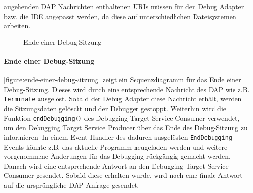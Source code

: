 augehenden DAP Nachrichten enthaltenen URIs müssen für den Debug Adapter bzw. die IDE angepasst werden, da diese auf unterschiedlichen Dateisystemen arbeiten.

\begin{figure}[tbp]
    \centering
    \caption{Ende einer Debug-Sitzung}
    \label{figure:ende-einer-debug-sitzung}
\end{figure}

\paragraph{Ende einer Debug-Sitzung} \autoref{figure:ende-einer-debug-sitzung} zeigt ein Sequenzdiagramm für das Ende einer Debug-Sitzung. Dieses wird durch eine entsprechende Nachricht des \ac{DAP} wie z.B. \texttt{Terminate} ausgelöst. Sobald der Debug Adapter diese Nachricht erhält, werden die Sitzungsdaten gelöscht und der Debugger gestoppt. Weiterhin wird die Funktion \texttt{endDebugging()} des Debugging Target Service Consumer verwendet, um den Debugging Target Service Producer über das Ende des Debug-Sitzung zu informieren. In einem Event Handler des dadurch ausgelösten \texttt{EndDebugging}-Events könnte z.B. das aktuelle Programm neugeladen werden und weitere vorgenommene Änderungen für das Debugging rückgängig gemacht werden. Danach wird eine entsprechende Antwort an den Debugging Target Service Consumer gesendet. Sobald diese erhalten wurde, wird noch eine finale Antwort auf die ursprüngliche \ac{DAP} Anfrage gesendet.

